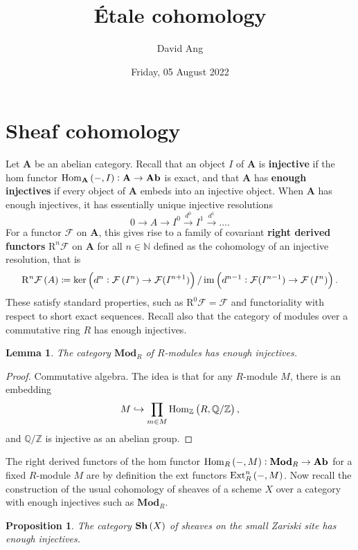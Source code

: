 \documentclass{article}
\title{\'Etale cohomology}
\author{David Ang}
\date{Friday, 05 August 2022}
\newtheorem*{lemma}{Lemma}
\newtheorem*{proposition}{Proposition}
\newcommand{\A}{\mathbf{A}}
\newcommand{\Ab}{\mathbf{Ab}}
\newcommand{\br}{\del}
\newcommand{\Ext}{\mathrm{Ext}}
\newcommand{\F}{\mathcal{F}}
\newcommand{\Hom}{\mathrm{Hom}}
\newcommand{\im}{\operatorname{im}}
\newcommand{\Mod}{\mathbf{Mod}}
\newcommand{\N}{\mathbb{N}}
\newcommand{\Q}{\mathbb{Q}}
\newcommand{\R}{\mathrm{R}}
\newcommand{\Sh}{\mathbf{Sh}}
\newcommand{\Z}{\mathbb{Z}}
\begin{document}
\maketitle

\section{Sheaf cohomology}

Let $ \A $ be an abelian category. Recall that an object $ I $ of $ \A $ is \textbf{injective} if the hom functor $ \Hom_\A\br{-, I} : \A \to \Ab $ is exact, and that $ \A $ has \textbf{enough injectives} if every object of $ \A $ embeds into an injective object. When $ \A $ has enough injectives, it has essentially unique injective resolutions
$$  0 \to A \to I^0 \xrightarrow{d^0} I^1 \xrightarrow{d^1} \dots. $$
For a functor $ \F $ on $ \A $, this gives rise to a family of covariant \textbf{right derived functors} $ \R^n\F $ on $ \A $ for all $ n \in \N $ defined as the cohomology of an injective resolution, that is
$$ \R^n\F\br{A} \coloneqq \ker\br{d^n : \F\br{I^n} \to \F(I^{n + 1})} / \im\br{d^{n - 1} : \F(I^{n - 1}) \to \F\br{I^n}}. $$
These satisfy standard properties, such as $ \R^0\F = \F $ and functoriality with respect to short exact sequences. Recall also that the category of modules over a commutative ring $ R $ has enough injectives.

\begin{lemma}
The category $ \Mod_R $ of $ R $-modules has enough injectives.
\end{lemma}

\begin{proof}
Commutative algebra. The idea is that for any $ R $-module $ M $, there is an embedding
$$ M \hookrightarrow \prod_{m \in M} \Hom_\Z\br{R, \Q / \Z}, $$
and $ \Q / \Z $ is injective as an abelian group.
\end{proof}

The right derived functors of the hom functor $ \Hom_R\br{-, M} : \Mod_R \to \Ab $ for a fixed $ R $-module $ M $ are by definition the ext functors $ \Ext_R^n\br{-, M} $. Now recall the construction of the usual cohomology of sheaves of a scheme $ X $ over a category with enough injectives such as $ \Mod_R $.

\begin{proposition}
The category $ \Sh\br{X} $ of sheaves on the small Zariski site has enough injectives.
\end{proposition}
\end{document}

